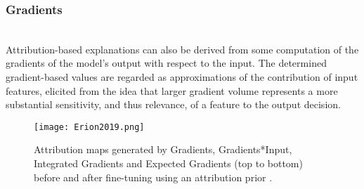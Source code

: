 \documentclass[journal]{IEEEtran}
\begin{document}
\subsubsection{Gradients}
\hfill\\
Attribution-based explanations can also be derived from some computation of the gradients of the model's output with respect to the input. The determined gradient-based values are regarded as approximations of the contribution of input features, elicited from the idea that larger gradient volume represents a more substantial sensitivity, and thus relevance, of a feature to the output decision. \cite{Du2018}

\begin{figure}
  \texttt{[image: Erion2019.png]}
  \caption{Attribution maps generated by Gradients, Gradients*Input, Integrated Gradients and Expected Gradients (top to bottom) before and after fine-tuning using an attribution prior \cite{Erion2019}.}
\end{figure}
\end{document}
